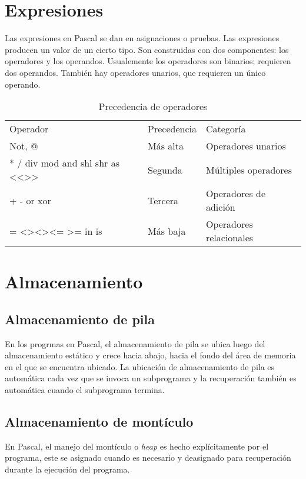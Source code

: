 \documentclass{IEEEtran}
\begin{document}
\section{Expresiones}
Las expresiones en Pascal se dan en asignaciones o pruebas. Las expresiones producen un valor de un cierto tipo. Son construidas con dos componentes: los operadores y los operandos. Usualemente los operadores son binarios; requieren dos operandos. Tambi\'en hay operadores unarios, que requieren un \'unico operando.
\begin{table}[H]
\centering
\caption{Precedencia de operadores}
\begin{tabular}{lll}
Operador                                                                      & Precedencia & Categor\'ia             \\
Not, @                                                                        & M\'as alta  & Operadores unarios      \\
* / div mod and shl shr as \textless\textless \textgreater\textgreater        & Segunda     & M\'ultiples operadores  \\
+ - or xor                                                                    & Tercera     & Operadores de adici\'on \\
= \textless\textgreater \textless \textgreater \textless= \textgreater= in is & M\'as baja  & Operadores relacionales
\end{tabular}
\end{table}
\section{Almacenamiento}
\subsection{Almacenamiento de pila}
En los progrmas en Pascal, el almacenamiento de pila se ubica luego del almacenamiento est\'atico y crece hacia abajo, hacia el fondo del \'area de memoria en el que se encuentra ubicado. La ubicaci\'on de almacenamiento de pila es autom\'atica cada vez que se invoca un subprograma y la recuperaci\'on tambi\'en es autom\'atica cuando el subprograma termina.
\subsection{Almacenamiento de mont\'iculo}
En Pascal, el manejo del mont\'iculo o \emph{heap} es hecho expl\'icitamente por el programa, este se asignado cuando es necesario y deasignado para recuperaci\'on durante la ejecuci\'on del programa.
\end{document}
